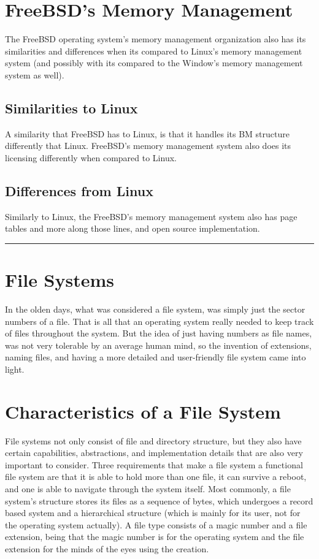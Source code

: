 \documentclass[letterpaper,10pt,onecolumn]{IEEEtran}
\begin{document}
\section*{FreeBSD's Memory Management}
\par
The FreeBSD operating system's memory management organization also has its similarities and differences when its compared to Linux's memory management system (and possibly with its compared to the Window's memory management system as well).

	\subsection*{Similarities to Linux}
	\par
	A similarity that FreeBSD has to Linux, is that it handles its BM structure differently that Linux. FreeBSD's memory management system also does its licensing differently when compared to Linux.

	\subsection*{Differences from Linux}
	\par
	Similarly to Linux, the FreeBSD's memory management system also has page tables and more along those lines, and open source implementation.
	
\noindent\rule{17.8cm}{0.4pt}
\section{\textbf{File Systems}}
\par
In the olden days, what was considered a file system, was simply just the sector numbers of a file. That is all that an operating system really needed to keep track of files throughout the system. But the idea of just having numbers as file names, was not very tolerable by an average human mind, so the invention of extensions, naming files, and having a more detailed and user-friendly file system came into light. 

\section*{Characteristics of a File System}
\par
File systems not only consist of file and directory structure, but they also have certain capabilities, abstractions, and implementation details that are also very important to consider. Three requirements that make a file system a functional file system are that it is able to hold more than one file, it can survive a reboot, and one is able to navigate through the system itself. Most commonly, a file system's structure  stores its files as a sequence of bytes, which undergoes a record based system and a hierarchical structure (which is mainly for its user, not for the operating system actually). A file type consists of a magic number and a file extension, being that the magic number is for the operating system and the file extension for the minds of the eyes using the creation.
\end{document}
